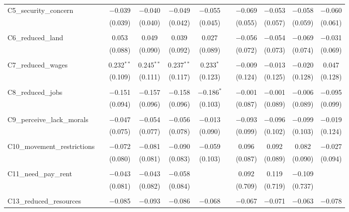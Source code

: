\begin{table}[H]
\begin{tabular}{@{\extracolsep{4pt}}lcccccccccc}
 C5\_security\_concern &  & $-$0.039 & $-$0.040 & $-$0.049 & $-$0.055 &  & $-$0.069 & $-$0.053 & $-$0.058 & $-$0.060 \\ 
  &  & (0.039) & (0.040) & (0.042) & (0.045) &  & (0.055) & (0.057) & (0.059) & (0.061) \\ 
  & & & & & & & & & & \\ 
 C6\_reduced\_land &  & 0.053 & 0.049 & 0.039 & 0.027 &  & $-$0.056 & $-$0.054 & $-$0.069 & $-$0.031 \\ 
  &  & (0.088) & (0.090) & (0.092) & (0.089) &  & (0.072) & (0.073) & (0.074) & (0.069) \\ 
  & & & & & & & & & & \\ 
 C7\_reduced\_wages &  & 0.232$^{**}$ & 0.245$^{**}$ & 0.237$^{**}$ & 0.233$^{*}$ &  & $-$0.009 & $-$0.013 & $-$0.020 & 0.047 \\ 
  &  & (0.109) & (0.111) & (0.117) & (0.123) &  & (0.124) & (0.125) & (0.128) & (0.128) \\ 
  & & & & & & & & & & \\ 
 C8\_reduced\_jobs &  & $-$0.151 & $-$0.157 & $-$0.158 & $-$0.186$^{*}$ &  & $-$0.001 & $-$0.001 & $-$0.006 & $-$0.095 \\ 
  &  & (0.094) & (0.096) & (0.096) & (0.103) &  & (0.087) & (0.089) & (0.089) & (0.099) \\ 
  & & & & & & & & & & \\ 
 C9\_perceive\_lack\_morals &  & $-$0.047 & $-$0.054 & $-$0.056 & $-$0.013 &  & $-$0.093 & $-$0.096 & $-$0.099 & $-$0.019 \\ 
  &  & (0.075) & (0.077) & (0.078) & (0.090) &  & (0.099) & (0.102) & (0.103) & (0.124) \\ 
  & & & & & & & & & & \\ 
 C10\_movement\_restrictions &  & $-$0.072 & $-$0.081 & $-$0.090 & $-$0.059 &  & 0.096 & 0.092 & 0.082 & $-$0.027 \\ 
  &  & (0.080) & (0.081) & (0.083) & (0.103) &  & (0.087) & (0.089) & (0.090) & (0.094) \\ 
  & & & & & & & & & & \\ 
 C11\_need\_pay\_rent &  & $-$0.043 & $-$0.043 & $-$0.058 &  &  & 0.092 & 0.119 & $-$0.109 &  \\ 
  &  & (0.081) & (0.082) & (0.084) &  &  & (0.709) & (0.719) & (0.737) &  \\ 
  & & & & & & & & & & \\ 
 C13\_reduced\_resources &  & $-$0.085 & $-$0.093 & $-$0.086 & $-$0.068 &  & $-$0.067 & $-$0.071 & $-$0.063 & $-$0.078 \\ 

\end{tabular}
\end{table}
